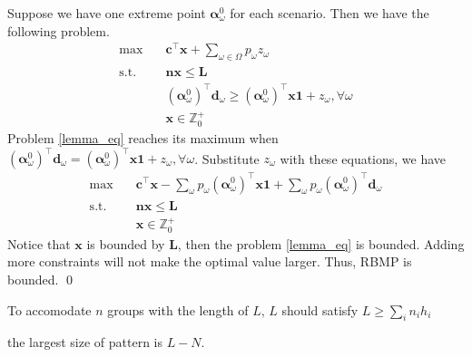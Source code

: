  \begin{pf}
    Suppose we have one extreme point $\bm{\alpha}_{\omega}^{0}$ for each scenario. Then we have the following problem.
    \begin{equation}\label{lemma_eq}
      \begin{aligned}
        \max \quad & \mathbf{c}^{\intercal} \mathbf{x} + \sum_{\omega \in \Omega} p_{\omega} z_{\omega} \\
        \text {s.t.} \quad & \mathbf{n} \mathbf{x} \leq \mathbf{L} \\
        & (\bm{\alpha}_{\omega}^{0})^{\intercal}\mathbf{d}_{\omega} \geq (\bm{\alpha}_{\omega}^{0})^{\intercal} \mathbf{x} \mathbf{1} + z_{\omega}, \forall \omega \\
         & \mathbf{x} \in \mathbb{Z}^{+}_{0}
      \end{aligned}
    \end{equation}
    Problem \eqref{lemma_eq} reaches its maximum when $(\bm{\alpha}_{\omega}^{0})^{\intercal}\mathbf{d}_{\omega} = (\bm{\alpha}_{\omega}^{0})^{\intercal} \mathbf{x} \mathbf{1} + z_{\omega}, \forall \omega$. Substitute $z_{\omega}$ with these equations, we have 
    \begin{equation}\label{lemma_eq2}
      \begin{aligned}
        \max \quad & \mathbf{c}^{\intercal} \mathbf{x} - \sum_{\omega}p_{\omega}(\bm{\alpha}_{\omega}^{0})^{\intercal} \mathbf{x} \mathbf{1} + \sum_{\omega} p_{\omega} (\bm{\alpha}_{\omega}^{0})^{\intercal} \mathbf{d}_{\omega} \\
        \text {s.t.} \quad & \mathbf{n} \mathbf{x} \leq \mathbf{L} \\
        & \mathbf{x} \in \mathbb{Z}^{+}_{0}
      \end{aligned}
    \end{equation}
    Notice that $\mathbf{x}$ is bounded by $\mathbf{L}$, then the problem \eqref{lemma_eq} is bounded. Adding more constraints will not make the optimal value larger. Thus, RBMP is bounded. 
    \qed
  \end{pf}




\begin{pf}[Proof of ]
To accomodate $n$ groups with the length of $L$, $L$ should satisfy $L \geq \sum_{i} n_i h_i$

the largest size of pattern is $L-N$.   


\end{pf}



